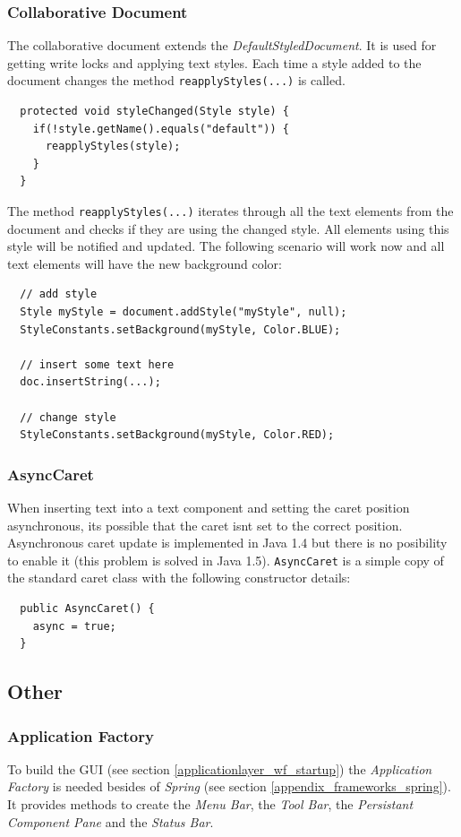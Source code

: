 \subsubsection{Collaborative Document}
\label{applicationlayer_collabdocument}
The collaborative document extends the \textit{DefaultStyledDocument}. It is used for getting write locks and applying text styles. Each time a style added to the document changes the method \texttt{reapplyStyles(...)} is called.
\begin{verbatim}
  protected void styleChanged(Style style) {
    if(!style.getName().equals("default")) {
      reapplyStyles(style);
    }
  }
\end{verbatim}

The method \texttt{reapplyStyles(...)} iterates through all the text elements from the document and checks if they are using the changed style. All elements using this style will be notified and updated. The following scenario will work now and all text elements will have the new background color:
\begin{verbatim}
  // add style
  Style myStyle = document.addStyle("myStyle", null);
  StyleConstants.setBackground(myStyle, Color.BLUE);
  
  // insert some text here
  doc.insertString(...);
  
  // change style
  StyleConstants.setBackground(myStyle, Color.RED);
\end{verbatim}

\subsubsection{AsyncCaret}
When inserting text into a text component and setting the caret position asynchronous, its possible that the caret isnt set to the correct position. Asynchronous caret update is implemented in Java 1.4 but there is no posibility to enable it (this problem is solved in Java 1.5). \texttt{AsyncCaret} is a simple copy of the standard caret class with the following constructor details:
\begin{verbatim}
  public AsyncCaret() {
    async = true;
  }
\end{verbatim}

\subsection{Other}
\subsubsection{Application Factory}
\label{applicationlayer_applicationfactory}
To build the GUI (see section \ref{applicationlayer_wf_startup}) the \textit{Application Factory} is needed besides of \textit{Spring} (see section \ref{appendix_frameworks_spring}). It provides methods to create the \textit{Menu Bar}, the \textit{Tool Bar}, the \textit{Persistant Component Pane} and the \textit{Status Bar}.


